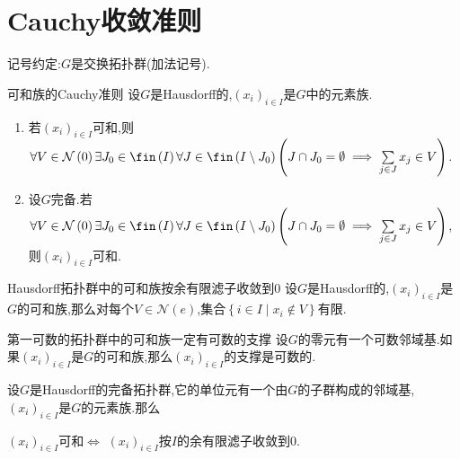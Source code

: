 \section{Cauchy收敛准则}

记号约定:$G$是交换拓扑群(加法记号).

\begin{theorem}{可和族的Cauchy准则}{}
	设$G$是Hausdorff的,$\left(x_{i}\right)_{i\in I}$是$G$中的元素族.
	\begin{enumerate}
		\item 若$\left(x_{i}\right)_{i\in I}$可和,则$\forall V\in\mathcal{N}\left(0\right)\exists J_{0}\in\fin\left(I\right)\forall J\in\fin\left(I\setminus J_{0}\right)\left(J\cap J_{0}=\emptyset\implies\sum\limits_{j\in J}x_{j}\in V\right)$.
		\item 设$G$完备.若$\forall V\in\mathcal{N}\left(0\right)\exists J_{0}\in\fin\left(I\right)\forall J\in\fin\left(I\setminus J_{0}\right)\left(J\cap J_{0}=\emptyset\implies\sum\limits_{j\in J}x_{j}\in V\right)$,则$\left(x_{i}\right)_{i\in I}$可和.
	\end{enumerate}
\end{theorem}

\begin{proposition}{Hausdorff拓扑群中的可和族按余有限滤子收敛到$0$}{}
	设$G$是Hausdorff的,$\left(x_{i}\right)_{i\in I}$是$G$的可和族,那么对每个$V\in\mathcal{N}\left(e\right)$,集合$\left\{i\in I\middle|x_{i}\notin V\right\}$有限.
\end{proposition}

\begin{corollary}{第一可数的拓扑群中的可和族一定有可数的支撑}{}
	设$G$的零元有一个可数邻域基.如果$\left(x_{i}\right)_{i\in I}$是$G$的可和族,那么$\left(x_{i}\right)_{i\in I}$的支撑是可数的.
\end{corollary}

\begin{corollary}{}{}
	设$G$是Hausdorff的完备拓扑群,它的单位元有一个由$G$的子群构成的邻域基,$\left(x_{i}\right)_{i\in I}$是$G$的元素族.那么
	\begin{center}
		$\left(x_{i}\right)_{i\in I}$可和$\iff$ $\left(x_{i}\right)_{i\in I}$按$I$的余有限滤子收敛到$0$.
	\end{center}
\end{corollary}
